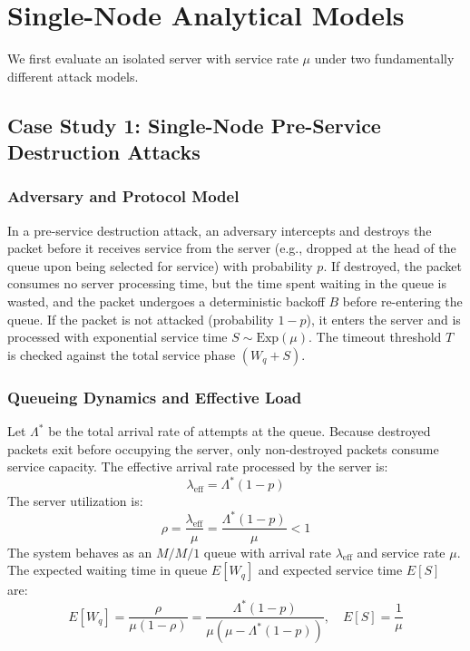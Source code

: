 \documentclass[12pt,onecolumn]{article}
\begin{document}
\section{Single-Node Analytical Models}
We first evaluate an isolated server with service rate $\mu$ under two fundamentally different attack models.

\subsection{Case Study 1: Single-Node Pre-Service Destruction Attacks}
\subsubsection{Adversary and Protocol Model}
In a pre-service destruction attack, an adversary intercepts and destroys the packet before it receives service from the server (e.g., dropped at the head of the queue upon being selected for service) with probability $p$. If destroyed, the packet consumes no server processing time, but the time spent waiting in the queue is wasted, and the packet undergoes a deterministic backoff $B$ before re-entering the queue. If the packet is not attacked (probability $1 - p$), it enters the server and is processed with exponential service time $S \sim \text{Exp}(\mu)$. The timeout threshold $T$ is checked against the total service phase $(W_q + S)$.

\subsubsection{Queueing Dynamics and Effective Load}
Let $\Lambda^*$ be the total arrival rate of attempts at the queue. Because destroyed packets exit before occupying the server, only non-destroyed packets consume service capacity. The effective arrival rate processed by the server is:
\begin{equation}
\lambda_{\text{eff}} = \Lambda^*(1 - p)
\end{equation}
The server utilization is:
\begin{equation}
\rho = \frac{\lambda_{\text{eff}}}{\mu} = \frac{\Lambda^*(1 - p)}{\mu} < 1
\end{equation}
The system behaves as an $M/M/1$ queue with arrival rate $\lambda_{\text{eff}}$ and service rate $\mu$. The expected waiting time in queue $E[W_q]$ and expected service time $E[S]$ are:
\begin{equation}
E[W_q] = \frac{\rho}{\mu(1 - \rho)} = \frac{\Lambda^*(1 - p)}{\mu(\mu - \Lambda^*(1 - p))}, \quad E[S] = \frac{1}{\mu}
\end{equation}
\end{document}
